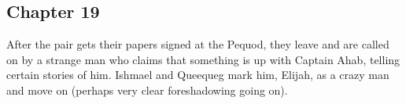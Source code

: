 \subsection{Chapter 19}

After the pair gets their papers signed at the Pequod, they leave and are
called on by a strange man who claims that something is up with Captain Ahab,
telling certain stories of him. Ishmael and Queequeg mark him, Elijah, as a
crazy man and move on (perhaps very clear foreshadowing going on).
